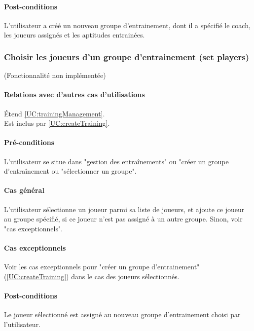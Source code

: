 \paragraph{Post-conditions}
\begin{list}{}{\leftmargin=1.5em}
\item{L'utilisateur a créé un nouveau groupe d'entrainement, dont il a spécifié le coach, les joueurs assignés et les aptitudes entrainées.}
\end{list}

\subsubsection{Choisir les joueurs d'un groupe d'entrainement (set players)}
\label{UC:addPlayerToGroup}
(Fonctionnalité non implémentée)
\paragraph{Relations avec d'autres cas d'utilisations}
Étend \ref{UC:trainingManagement}.\\
Est inclus par \ref{UC:createTraining}.
\paragraph{Pré-conditions}
\begin{list}{}{\leftmargin=1.5em}
\item{L'utilisateur se situe dans "gestion des entraînements" ou "créer un groupe d'entraînement ou "sélectionner un groupe".}
\end{list}
\paragraph{Cas général}
L'utilisateur sélectionne un joueur parmi sa liste de joueurs, et ajoute ce joueur au groupe spécifié, si ce joueur n'est pas assigné à un autre groupe. Sinon, voir "cas exceptionnels". 
\paragraph{Cas exceptionnels}
Voir les cas exceptionnels pour "créer un groupe d'entrainement" (\ref{UC:createTraining}) dans le cas des joueurs sélectionnés.
\paragraph{Post-conditions}
\begin{list}{}{\leftmargin=1.5em}
\item{Le joueur sélectionné est assigné au nouveau groupe d'entrainement choisi par l'utilisateur.}
\end{list}

